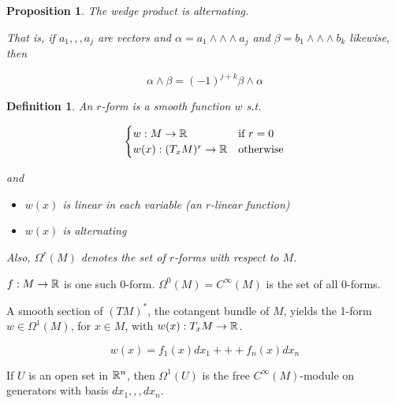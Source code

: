 \documentclass[11pt]{amsbook}
\theoremstyle{mystyle} \newtheorem{thrm}[thm]{Theorem}
\theoremstyle{mystyle} \newtheorem{defi}[thm]{Definition}
\theoremstyle{mystyle} \newtheorem{coro}[thm]{Corollary}
\theoremstyle{mystyle} \newtheorem{propo}[thm]{Proposition}
\theoremstyle{mystyle} \newtheorem{lemm}[thm]{Lemma}
\numberwithin{thm}{section}
\newcommand{\de}{\emph}
\begin{document}
\begin{propo}
	The wedge product is alternating.

	That is, if $a_1,,,a_j$ are vectors and $\alpha = a_1 \wedge\wedge\wedge a_j$ and $\beta = b_1 \wedge\wedge\wedge b_k$ likewise, then

	$$\alpha \wedge \beta = (-1)^{j+k} \beta \wedge \alpha$$
\end{propo}

\begin{defi}
	An \de{$r$-form} is a smooth function $w$ s.t.

	$$\begin{cases}
		w: M \to {\mathbb R} 	&\text{if $r = 0$} \\
		w(x): (T_xM)^r \to {\mathbb R} 	&\text{otherwise} \\
	\end{cases}$$

	and

	\begin{itemize}
	  \item $w(x)$ is linear in each variable (an $r$-linear function)
	  \item $w(x)$ is alternating
	\end{itemize}

	Also, $\Omega^r(M)$ denotes the set of $r$-forms with respect to $M$.
\end{defi}

\begin{example}[0-form]
	$f: M \to {\mathbb R}$ is one such 0-form.
	$\Omega^0(M) = C^\infty(M)$ is the set of all 0-forms.
\end{example}

\begin{example}[1-form]
	A smooth section of $(TM)^*$, the cotangent bundle of $M$, yields the 1-form
	$w \in \Omega^1(M)$, for $x \in M$, with $w(x): T_xM \to {\mathbb R}$.
\end{example}

\begin{example}[1-form]
	$$w(x) = f_1(x)dx_1 +++ f_n(x)dx_n$$
\end{example}

\begin{example}
	If $U$ is an open set in ${\mathbb R}^n$, then $\Omega^1(U)$ is the free $C^\infty(M)$-module on generators with basis ${dx_1,,,dx_n}$.
\end{example}
\end{document}
